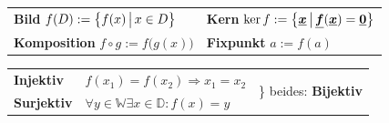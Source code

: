 \documentclass[german]{latex4ei/latex4ei_sheet}
\begin{document}
\begin{sectionbox}
	
	\begin{tabular*}{\columnwidth}{@{\extracolsep\fill}ll@{}}
	\textbf{Bild} $f(D) := \bigl\{ \bigl. f(x) \, \bigr| \, x\in D \bigr\}$ & \textbf{Kern} $\ker f := \bigl\{ \bigl. \boldsymbol{\underline{x}} \, \bigr| \, \boldsymbol{\underline{f}}(\boldsymbol{\underline{x}}) = \boldsymbol{\underline{0}} \bigr\}$   \\
	\textbf{Komposition} $f \circ g := f\bigl( g(x) \bigr)$ & \textbf{Fixpunkt} $a := f(a)$ \\
	\end{tabular*} 
	
	\begin{tabular}{@{}lll}
			\textbf{Injektiv} & $f(x_1)=f(x_2) \Rightarrow x_1=x_2$ & \multirow{2}{2.0cm}{\Big \} beides: \textbf{Bijektiv} }\\
			\textbf{Surjektiv} & $\forall y\in \mathbb W \exists x\in \mathbb D:f(x)=y$ & \\ 
	\end{tabular}\\ 
\end{sectionbox}
\end{document}
